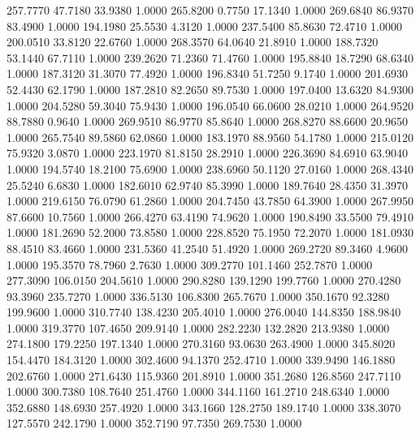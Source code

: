   257.7770   47.7180   33.9380    1.0000
  265.8200    0.7750   17.1340    1.0000
  269.6840   86.9370   83.4900    1.0000
  194.1980   25.5530    4.3120    1.0000
  237.5400   85.8630   72.4710    1.0000
  200.0510   33.8120   22.6760    1.0000
  268.3570   64.0640   21.8910    1.0000
  188.7320   53.1440   67.7110    1.0000
  239.2620   71.2360   71.4760    1.0000
  195.8840   18.7290   68.6340    1.0000
  187.3120   31.3070   77.4920    1.0000
  196.8340   51.7250    9.1740    1.0000
  201.6930   52.4430   62.1790    1.0000
  187.2810   82.2650   89.7530    1.0000
  197.0400   13.6320   84.9300    1.0000
  204.5280   59.3040   75.9430    1.0000
  196.0540   66.0600   28.0210    1.0000
  264.9520   88.7880    0.9640    1.0000
  269.9510   86.9770   85.8640    1.0000
  268.8270   88.6600   20.9650    1.0000
  265.7540   89.5860   62.0860    1.0000
  183.1970   88.9560   54.1780    1.0000
  215.0120   75.9320    3.0870    1.0000
  223.1970   81.8150   28.2910    1.0000
  226.3690   84.6910   63.9040    1.0000
  194.5740   18.2100   75.6900    1.0000
  238.6960   50.1120   27.0160    1.0000
  268.4340   25.5240    6.6830    1.0000
  182.6010   62.9740   85.3990    1.0000
  189.7640   28.4350   31.3970    1.0000
  219.6150   76.0790   61.2860    1.0000
  204.7450   43.7850   64.3900    1.0000
  267.9950   87.6600   10.7560    1.0000
  266.4270   63.4190   74.9620    1.0000
  190.8490   33.5500   79.4910    1.0000
  181.2690   52.2000   73.8580    1.0000
  228.8520   75.1950   72.2070    1.0000
  181.0930   88.4510   83.4660    1.0000
  231.5360   41.2540   51.4920    1.0000
  269.2720   89.3460    4.9600    1.0000
  195.3570   78.7960    2.7630    1.0000
  309.2770  101.1460  252.7870    1.0000
  277.3090  106.0150  204.5610    1.0000
  290.8280  139.1290  199.7760    1.0000
  270.4280   93.3960  235.7270    1.0000
  336.5130  106.8300  265.7670    1.0000
  350.1670   92.3280  199.9600    1.0000
  310.7740  138.4230  205.4010    1.0000
  276.0040  144.8350  188.9840    1.0000
  319.3770  107.4650  209.9140    1.0000
  282.2230  132.2820  213.9380    1.0000
  274.1800  179.2250  197.1340    1.0000
  270.3160   93.0630  263.4900    1.0000
  345.8020  154.4470  184.3120    1.0000
  302.4600   94.1370  252.4710    1.0000
  339.9490  146.1880  202.6760    1.0000
  271.6430  115.9360  201.8910    1.0000
  351.2680  126.8560  247.7110    1.0000
  300.7380  108.7640  251.4760    1.0000
  344.1160  161.2710  248.6340    1.0000
  352.6880  148.6930  257.4920    1.0000
  343.1660  128.2750  189.1740    1.0000
  338.3070  127.5570  242.1790    1.0000
  352.7190   97.7350  269.7530    1.0000

